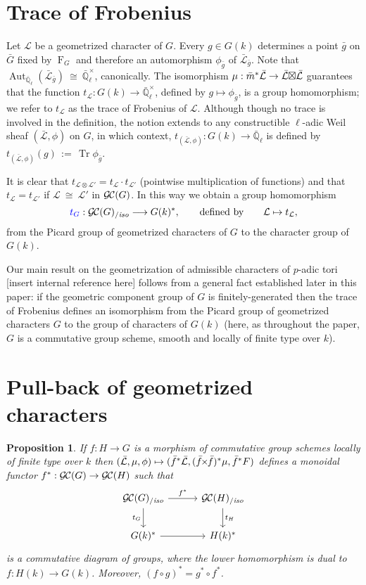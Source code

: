 \documentclass[11pt]{amsart}
\theoremstyle{plain}
\newtheorem{proposition}[theorem]{Proposition}
\theoremstyle{definition}
\theoremstyle{remark}
\newcommand{\EE}{\mathbb{\bar Q}_\ell}
\newcommand{\Fq}{k}
\newcommand{\EEx}{\EE^\times}
\newcommand{\Frob}[1]{{\operatorname{F}_{#1}}}
\DeclareMathOperator{\Aut}{Aut}
\DeclareMathOperator{\Hom}{Hom}
\DeclareMathOperator{\trace}{Tr}
\newcommand{\cdef}[1]{{{\color{blue}#1}\index{#1}}}
\newcommand{\ceq}{{\, :=\, }}
\newcommand{\iso}{{\ \cong\ }}
\newcommand{\cs}[1]{{\mathcal{#1}}}
\newcommand{\gcs}[1]{{\mathcal{\bar #1}}}
\newcommand{\GC}{{\mathcal{G\hskip-0.8pt C}}}
\newcommand{\GCiso}[1]{\GC(#1)_{/\textit{iso}}}
\newcommand{\trFrob}[1]{t_{#1}}
\renewcommand{\bf}{\bar{f}}
\newcommand{\bg}{\bar{g}}
\newcommand{\bm}{\bar{m}}
\newcommand{\bG}{\bar{G}}
\newcommand{\tight}[3]{\hspace{-#1pt}{#2}\hspace{-#3pt}}
\newcommand{\bfxf}{\text{$\bar{f} \tight{1}{\times}{1} \bar{f}$}}
\newcommand{\LxL}{\text{$\gcs{L} \tight{0}{\boxtimes}{0} \gcs{L}$}}
\begin{document}
\section{Trace of Frobenius}\label{sec:Frob}

Let $\cs{L}$ be a geometrized character of $G$. Every $g\in G(\Fq)$
determines a point $\bg$ on $\bG$ fixed by $\Frob{G}$ and
therefore an automorphism $\phi_{\bg}$ of $\gcs{L}_{\bg}$. Note
that $\Aut_{\EE}(\gcs{L}_{\bg}) \iso \EEx$, canonically. The isomorphism $\mu : \bm^* \gcs{L} \to \LxL$
guarantees that the function $\trFrob{\cs{L}} : G(\Fq)\to \EEx$,
defined by $g \mapsto \phi_{\bg}$, is a group homomorphism;
we refer to $\trFrob{\cs{L}}$ as the \cdef{trace of Frobenius of $\cs{L}$}.
Although though no trace is involved in the definition, the notion extends 
to any constructible $\ell$-adic Weil sheaf $(\gcs{L},\phi)$ on $G$, in which context,
$\trFrob{(\gcs{L},\phi)} : G(\Fq)\to \EE$ is defined by $\trFrob{(\gcs{L},\phi)}(g) \ceq \trace \phi_{\bg}$.

It is clear that $\trFrob{\cs{L}\otimes \cs{L'}} = \trFrob{\cs{L}} \cdot \trFrob{\cs{L'}}$
(pointwise multiplication of functions) and that $\trFrob{\cs{L}} = \trFrob{\cs{L'}}$
if $\cs{L} \iso \cs{L'}$ in $\GC(G)$. In this way we obtain a group homomorphism
\[
\cdef{\trFrob{G}} : \GCiso{G} \longrightarrow G(\Fq)^*,%
\qquad \text{defined by}\qquad \cs{L} \mapsto \trFrob{\cs{L}},
\]
from the Picard group of geometrized characters of $G$ to the character group of $G(\Fq)$.

Our main result on the geometrization of admissible characters of
$p$-adic tori [insert internal reference here] follows from a general
fact established later in this paper: if the geometric component group
of $G$ is finitely-generated then the trace of Frobenius defines an
isomorphism from the Picard group of geometrized characters $G$ to the
group of characters of $G(\Fq)$ (here, as throughout the paper, $G$ is
a commutative group scheme, smooth and locally of finite type over $\Fq$).

\section{Pull-back of geometrized characters}\label{subsection:pullback}

\begin{proposition}\label{prop:pullback}
  If $f : H\to G$ is a morphism of commutative group schemes locally of finite type over $\Fq$ then
  $(\gcs{L},\mu,\phi) \mapsto (\bf^*\gcs{L},(\bfxf)^*\mu,\bf^*F)$
  defines a monoidal functor $f^* : \GC(G) \to \GC(H)$ such that
  \[
  \begin{tikzcd}[row sep=20, column sep=30]
   \GCiso{G} \rar{f^*} \arrow[swap]{d}{\trFrob{G}} & \GCiso{H} \dar{t_H} \\
   G(\Fq)^* \rar & H(\Fq)^*
  \end{tikzcd}
  \]
  is a commutative diagram of groups, where the lower homomorphism is
  dual to $f : H(\Fq)\to G(\Fq)$.  Moreover, $(f\circ g)^* = g^* \circ f^*$.
\end{proposition}
\end{document}
